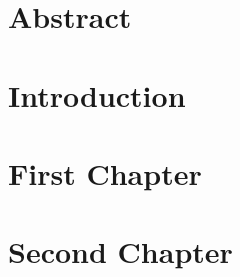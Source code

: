 \documentclass[paper=a4, fontsize=12pt]{report}
\begin{document}
	\begin{titlepage}
		\printTitlePage		
	\end{titlepage}

	\chapter*{Abstract}\label{sec:abstract}

	\tableofcontents
	\thispagestyle{empty}
	
	\chapter{Introduction}\label{sec:introduction}
	
	\setcounter{page}{1}
		
	\chapter{First Chapter}\label{sec:first}
	

	
	\chapter{Second Chapter}\label{sec:second}
	
	
	
\end{document}
